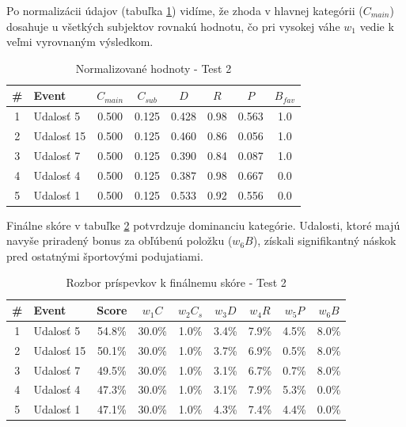 \documentclass[12pt,a4paper]{article}
\begin{document}
Po normalizácii údajov (tabuľka \ref{tab:norm_test2}) vidíme, že zhoda v hlavnej kategórii ($C_{main}$) dosahuje u všetkých subjektov rovnakú hodnotu, čo pri vysokej váhe $w_1$ vedie k veľmi vyrovnaným výsledkom.

\begin{table}[H]
\centering
\small
\begin{tabular}{|c|l|c|c|c|c|c|c|}
\hline
\textbf{\#} & \textbf{Event} & $C_{main}$ & $C_{sub}$ & $D$ & $R$ & $P$ & $B_{fav}$ \\
\hline
1 & Udalosť 5  & 0.500 & 0.125 & 0.428 & 0.98 & 0.563 & 1.0 \\
2 & Udalosť 15 & 0.500 & 0.125 & 0.460 & 0.86 & 0.056 & 1.0 \\
3 & Udalosť 7  & 0.500 & 0.125 & 0.390 & 0.84 & 0.087 & 1.0 \\
4 & Udalosť 4  & 0.500 & 0.125 & 0.387 & 0.98 & 0.667 & 0.0 \\
5 & Udalosť 1  & 0.500 & 0.125 & 0.533 & 0.92 & 0.556 & 0.0 \\
\hline
\end{tabular}
\caption{Normalizované hodnoty - Test 2}
\label{tab:norm_test2}
\end{table}

Finálne skóre v tabuľke \ref{tab:vysledky_test2} potvrdzuje dominanciu kategórie. Udalosti, ktoré majú navyše priradený bonus za obľúbenú položku ($w_6 B$), získali signifikantný náskok pred ostatnými športovými podujatiami.

\begin{table}[H]
\centering
\small
\begin{tabular}{|c|l|c|c|c|c|c|c|c|}
\hline
\textbf{\#} & \textbf{Event} & \textbf{Score} & $w_1 C$ & $w_2 C_s$ & $w_3 D$ & $w_4 R$ & $w_5 P$ & $w_6 B$ \\
\hline
1 & Udalosť 5  & 54.8\% & 30.0\% & 1.0\% & 3.4\% & 7.9\% & 4.5\% & 8.0\% \\
2 & Udalosť 15 & 50.1\% & 30.0\% & 1.0\% & 3.7\% & 6.9\% & 0.5\% & 8.0\% \\
3 & Udalosť 7  & 49.5\% & 30.0\% & 1.0\% & 3.1\% & 6.7\% & 0.7\% & 8.0\% \\
4 & Udalosť 4  & 47.3\% & 30.0\% & 1.0\% & 3.1\% & 7.9\% & 5.3\% & 0.0\% \\
5 & Udalosť 1  & 47.1\% & 30.0\% & 1.0\% & 4.3\% & 7.4\% & 4.4\% & 0.0\% \\
\hline
\end{tabular}
\caption{Rozbor príspevkov k finálnemu skóre - Test 2}
\label{tab:vysledky_test2}
\end{table}
\end{document}
